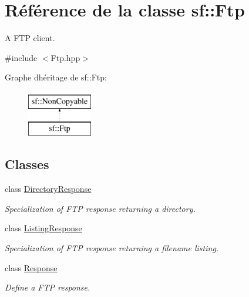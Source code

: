 \hypertarget{classsf_1_1Ftp}{}\section{Référence de la classe sf\+:\+:Ftp}
\label{classsf_1_1Ftp}


A F\+TP client.  




{\ttfamily \#include $<$Ftp.\+hpp$>$}

Graphe d\textquotesingle{}héritage de sf\+:\+:Ftp\+:\begin{figure}[H]
\begin{center}
\leavevmode
\includegraphics[height=2.000000cm]{classsf_1_1Ftp}
\end{center}
\end{figure}
\subsection*{Classes}
\begin{DoxyCompactItemize}
\item 
class \hyperlink{classsf_1_1Ftp_1_1DirectoryResponse}{Directory\+Response}
\begin{DoxyCompactList}\small\item\em Specialization of F\+TP response returning a directory. \end{DoxyCompactList}\item 
class \hyperlink{classsf_1_1Ftp_1_1ListingResponse}{Listing\+Response}
\begin{DoxyCompactList}\small\item\em Specialization of F\+TP response returning a filename listing. \end{DoxyCompactList}\item 
class \hyperlink{classsf_1_1Ftp_1_1Response}{Response}
\begin{DoxyCompactList}\small\item\em Define a F\+TP response. \end{DoxyCompactList}\end{DoxyCompactItemize}
